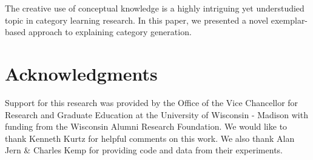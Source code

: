 \documentclass[10pt,letterpaper]{article}
\begin{document}
The creative use of conceptual knowledge is a highly intriguing yet understudied topic in category learning research. In this paper, we presented a novel exemplar-based approach to explaining category generation.

\section{Acknowledgments}
Support for this research was provided by the Office of the Vice Chancellor for Research and Graduate Education at the University of Wisconsin - Madison with funding from the Wisconsin Alumni Research Foundation. We would like to thank Kenneth Kurtz for helpful comments on this work. We also thank Alan Jern \& Charles Kemp for providing code and data from their experiments.




\setlength{\bibleftmargin}{.025in}
\setlength{\bibindent}{-\bibleftmargin}

\end{document}
